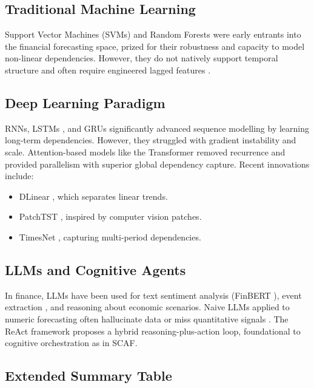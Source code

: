 \documentclass[conference]{IEEEtran}
\begin{document}
\subsection{Traditional Machine Learning}
Support Vector Machines (SVMs) and Random Forests \cite{breiman2001randomforest} were early entrants into the financial forecasting space, prized for their robustness and capacity to model non-linear dependencies. However, they do not natively support temporal structure and often require engineered lagged features \cite{huang2005forecasting}.

\subsection{Deep Learning Paradigm}
RNNs, LSTMs \cite{hochreiter1997lstm}, and GRUs significantly advanced sequence modelling by learning long-term dependencies. However, they struggled with gradient instability and scale. Attention-based models like the Transformer \cite{vaswani2017transformer} removed recurrence and provided parallelism with superior global dependency capture. Recent innovations include:
\begin{itemize}
  \item DLinear \cite{zeng2022ltsflinear}, which separates linear trends.
  \item PatchTST \cite{nie2023patchtst}, inspired by computer vision patches.
  \item TimesNet \cite{wu2023timesnet}, capturing multi-period dependencies.
\end{itemize}

\subsection{LLMs and Cognitive Agents}
In finance, LLMs have been used for text sentiment analysis (FinBERT \cite{huang2023finbertplus}), event extraction \cite{araci2019finbert}, and reasoning about economic scenarios. Naive LLMs applied to numeric forecasting often hallucinate data or miss quantitative signals \cite{luo2023llmbias, lin2022llmfinance}. The ReAct framework \cite{yao2022react} proposes a hybrid reasoning-plus-action loop, foundational to cognitive orchestration as in SCAF.

\subsection{Extended Summary Table}
\end{document}
